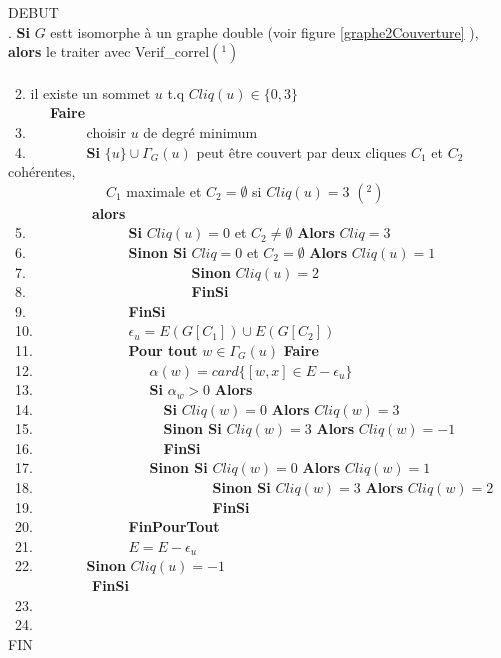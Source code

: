 \noindent DEBUT\\
. {\bf Si} $G$ estt isomorphe \`a un graphe double (voir figure \ref{graphe2Couverture} ), {\bf alors} le traiter avec Verif\_correl$(^1)$ \\
~~ \\
~2.  il existe un sommet $u$ t.q $Cliq(u) \in \{0,3\}$\\ 
       	\indent~~~~~~{\bf Faire}\\
~3.	       	\indent~~~~~~~~choisir $u$ de degr\'e minimum\\
~4.       	\indent~~~~~~~~{\bf Si} $\{u\} \cup \Gamma_G(u)$ peut \^etre couvert par deux cliques $C_1$ et $C_2$ coh\'erentes,\\
		\indent~~~~~~~~~~~~~~$C_1$ maximale et $C_2 = \emptyset$ si $Cliq(u)=3$ $(^2)$\\
	       	\indent~~~~~~~~~~~~{\bf alors}\\
~5.	       	\indent~~~~~~~~~~~~~~{\bf Si } $Cliq(u) = 0$ et $C_2\neq \emptyset$ {\bf Alors} $Cliq = 3$ \\
~6.		\indent~~~~~~~~~~~~~~{\bf Sinon Si} $Cliq = 0$ et $C_2 =  \emptyset$ {\bf Alors} $Cliq(u) = 1$\\
~7.		\indent~~~~~~~~~~~~~~~~~~~~~~~{\bf Sinon} $Cliq(u) = 2$ 	\\
~8.		\indent~~~~~~~~~~~~~~~~~~~~~~~{\bf FinSi}\\      	
~9.		\indent~~~~~~~~~~~~~~{\bf FinSi}\\
~10.		\indent ~~~~~~~~~~~~~$\epsilon_u = E(G[C_1]) \cup E(G[C_2])$\\
~11.		\indent ~~~~~~~~~~~~~{\bf Pour tout} $w \in \Gamma_G(u)$ {\bf Faire} \\
~12.		\indent~~~~~~~~~~~~~~~~$\alpha(w) = card\{[w,x] \in E - \epsilon_u\}$\\
~13.		\indent~~~~~~~~~~~~~~~~{\bf Si} $\alpha_w > 0$ {\bf Alors}\\
~14.		\indent~~~~~~~~~~~~~~~~~~{\bf Si} $Cliq(w) = 0$ {\bf Alors} $Cliq(w) =3$\\
~15.		\indent~~~~~~~~~~~~~~~~~~{\bf Sinon Si} $Cliq(w) = 3$ {\bf Alors} $Cliq(w) =-1$\\
~16.		\indent~~~~~~~~~~~~~~~~~~{\bf FinSi} \\
~17.		\indent~~~~~~~~~~~~~~~~{\bf Sinon Si} $Cliq(w) = 0$ {\bf Alors} $Cliq(w) =1$\\
~18. 	\indent~~~~~~~~~~~~~~~~~~~~~~~~~{\bf Sinon Si} $Cliq(w) = 3$ {\bf Alors} $Cliq(w) = 2$ \\
~19. 	\indent~~~~~~~~~~~~~~~~~~~~~~~~~{\bf FinSi} \\
~20.		\indent ~~~~~~~~~~~~~{\bf FinPourTout}\\
~21.		\indent ~~~~~~~~~~~~~$E = E - \epsilon_u$\\
~22.		\indent            ~~~~~~~{\bf Sinon} $Cliq(u) = -1$\\
	       	\indent~~~~~~~~~~~~{\bf FinSi}\\
~23. \\
~24. \\
\noindent FIN\\

